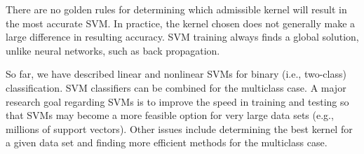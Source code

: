 There are no golden rules for determining which admissible kernel will result in the most accurate SVM. In practice, the kernel chosen does not generally make a large difference in resulting accuracy. SVM training always finds a global solution, unlike neural networks, such as back propagation.
\bigskip

So far, we have described linear and nonlinear SVMs for binary (i.e., two-class) classification. SVM classifiers can be combined for the multiclass case.  A major research goal regarding SVMs is to improve the speed in training and testing so that SVMs may become a more feasible option for very large data sets (e.g., millions of support vectors). Other issues include determining the best kernel for a given data set and finding more efficient methods for the multiclass case.\bigskip







